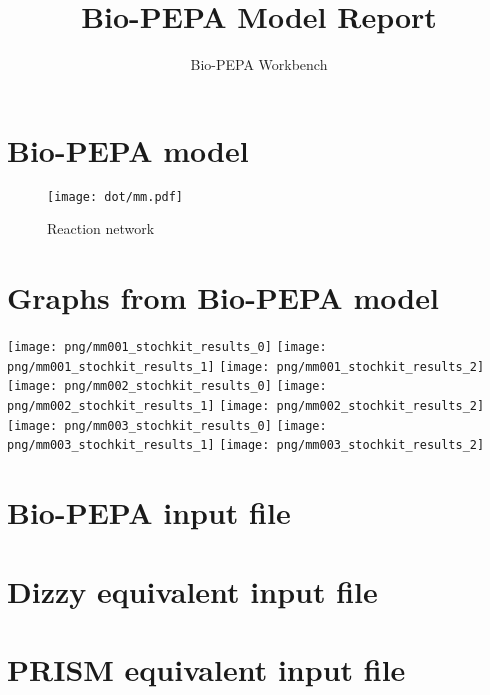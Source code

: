 \documentclass{llncs}
\title{Bio-PEPA Model Report}
\author{Bio-PEPA Workbench}
\institute{\today}
\begin{document}
\maketitle
\section{Bio-PEPA model}

\begin{figure}[htbp]
\begin{center}
\texttt{[image: dot/mm.pdf]}
\caption{Reaction network}
\end{center}
\end{figure}
\newpage
\section{Graphs from Bio-PEPA model}
\texttt{[image: png/mm001\_stochkit\_results\_0]}
\hfill
\texttt{[image: png/mm001\_stochkit\_results\_1]}
\hfill
\texttt{[image: png/mm001\_stochkit\_results\_2]}
\hfill
\texttt{[image: png/mm002\_stochkit\_results\_0]}
\hfill
\texttt{[image: png/mm002\_stochkit\_results\_1]}
\hfill
\texttt{[image: png/mm002\_stochkit\_results\_2]}
\hfill
\texttt{[image: png/mm003\_stochkit\_results\_0]}
\hfill
\texttt{[image: png/mm003\_stochkit\_results\_1]}
\hfill
\texttt{[image: png/mm003\_stochkit\_results\_2]}
\appendix
\newpage
\section{Bio-PEPA input file}

\newpage
\section{Dizzy equivalent input file}

\newpage
\section{PRISM equivalent input file}

\end{document}
